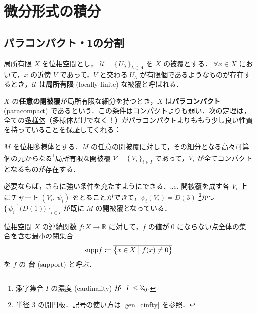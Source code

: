 \documentclass[geometry_main]{subfiles}
\begin{document}
\section{微分形式の積分}

\subsection{パラコンパクト・1の分割}

\begin{mydef}[label=def:locally-finite]{局所有限}
	$X$ を位相空間とし， $\mathcal{U} = \{\, U_\lambda \,\}_{\lambda \in \Lambda}$ を $X$ の被覆とする．
	$\forall x \in X$ において，$x$ の近傍 $V$ であって，$V$ と交わる $U_\lambda$ が有限個であるようなものが存在するとき，$\mathcal{U}$ は\textbf{局所有限} (locally finite) な被覆と呼ばれる．
\end{mydef}

$X$ の\textbf{任意の開被覆}が局所有限な細分を持つとき，$X$ は\textbf{パラコンパクト} (paracompact) であるという．この条件は\hyperref[def.compact]{コンパクト}よりも弱い．次の定理は，全ての\underline{多様体}（\cinfty 多様体だけでなく！）がパラコンパクトよりももう少し良い性質を持っていることを保証してくれる：
\begin{mytheo}[]{}
	$M$ を位相多様体とする．$M$ の任意の開被覆に対して，その細分となる高々可算個の元からなる\footnote{添字集合 $I$ の濃度 (cardinality) が $\abs{I} \le \aleph_0.$}局所有限な開被覆 $\mathcal{V} = \bigl\{\, V_i \,\bigr\}_{i \in I}$ であって，$\overline{V_i}$ が全てコンパクトとなるものが存在する．

	必要ならば，さらに強い条件を充たすようにできる．i.e. 開被覆を成す各 $V_i$ 上にチャート $(V_i,\, \psi_i)$ をとることができて，$\psi_i(V_i) = D(3)$ \footnote{半径 $3$ の開円板．記号の使い方は \ref{gen_cinfty} を参照．}かつ $\bigl\{\, \psi_i^{-1}\bigl(D(1)\bigr) \,\bigr\}_{i \in I}$ が既に $M$ の開被覆となっている．
\end{mytheo}

位相空間 $X$ の連続関数 $f \colon X \to \mathbb{R}$ に対して，$f$ の値が $0$ にならない点全体の集合を含む最小の閉集合
\begin{align} 
	\mathrm{supp} f \coloneqq \overline{\bigl\{ x \in X \bigm| f(x) \neq 0 \bigr\} }
\end{align}
を $f$ の \textbf{台} (support) と呼ぶ．
\end{document}

